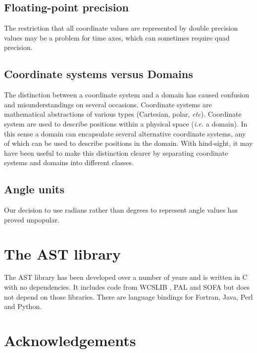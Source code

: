 \documentclass[final,authoryear,5p,times,twocolumn]{elsarticle}
\begin{document}
\subsection{Floating-point precision}

The restriction that all coordinate values are represented by
double precision values may be a problem for time axes, which can
sometimes require quad precision.

\subsection{Coordinate systems versus Domains}

The distinction between a coordinate system and a domain has caused
confusion and misunderstandings on several occasions. Coordinate systems are
mathematical abstractions of various types (Cartesian, polar, \emph{etc}).
Coordinate system are used to describe positions within a physical space
(\emph{i.e.} a domain). In this sense a domain can encapsulate several
alternative coordinate systems, any of which can be used to describe positions
in the domain. With hind-sight, it may have been useful to make this
distinction clearer by separating coordinate systems and domains into
different classes.

\subsection{Angle units}

Our decision to use radians rather than degrees to represent angle values
has proved unpopular.

\section{The AST library}

The AST library has been developed over a number of years
\citep{1998ASPC..145...41W,2000ASPC..216..506W,2001ASPC..238..129B,2004ASPC..314..412B,2008ASPC..394..635B,2010ASPC..434..213B,2012ASPC..461..825B}
  and is written in C with no dependencies. It includes code from
  WCSLIB \citep[][]{2006ASPC..351..591C}, PAL \citep{2013ASPC..475..307J}
  and SOFA \citep[][]{2011SchpJ...611404H} but does not depend on those
  libraries. There are language bindings for Fortran, Java, Perl and
  Python.

\section{Acknowledgements}
\end{document}
